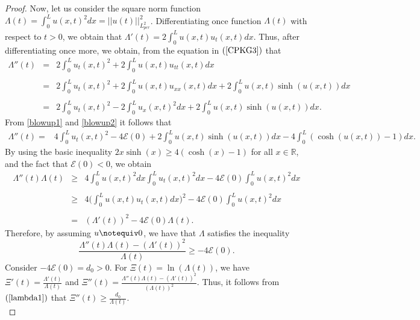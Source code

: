\documentclass[12pt,reqno,a4paper]{amsart} %
\numberwithin{equation}{section}
\numberwithin{figure}{section}
\begin{document}
\begin{proof}
	Now, let us consider the square norm function
	$\displaystyle \Lambda(t)=\int_0^Lu(x,t)^2dx=||u(t)||_{L_{per}^2}^2$. Differentiating  once function $\Lambda(t)$ with respect to $t>0$, we obtain that $\displaystyle \Lambda'(t)=2\int_0^Lu(x,t)u_t(x,t)dx$. Thus, after differentiating once more, we obtain, from the equation in $(\ref{CPKG3})$ that
	\begin{equation}\label{blowup2}\begin{array}{llllll}
		\Lambda''(t)&=&\displaystyle 2\int_0^L u_t(x,t)^2+2\int_0^Lu(x,t)u_{tt}(x,t)dx\\\\
		&=&\displaystyle  2\int_0^L u_t(x,t)^2+2\int_0^Lu(x,t)u_{xx}(x,t)dx+2\int_0^Lu(x,t)\sinh (u(x,t))dx\\\\
		&=&\displaystyle  2\int_0^L u_t(x,t)^2-2\int_0^Lu_{x}(x,t)^2dx+2\int_0^Lu(x,t)\sinh (u(x,t))dx. 
	\end{array}\end{equation}
	From \eqref{blowup1} and  \eqref{blowup2} it follows that 	 	
	\begin{align*} 
		\Lambda''(t)=&4\int_0^L u_t(x,t)^2-4\mathcal{E}(0)+2\int_0^Lu(x,t)\sinh (u(x,t))dx-4\int_0^L(\cosh(u(x,t))-1)dx.
	\end{align*}
	By using the basic inequality $2x\sinh(x)\ge 4(\cosh(x)-1)$ for all $x\in \mathbb{R}$, and the fact that $\mathcal{E}(0)<0$, we obtain 
	\begin{equation}\label{blowup3}\begin{array}{lllll}
		\Lambda''(t)\Lambda(t)&\ge& \displaystyle 4\int_0^Lu(x,t)^2dx\int_0^L u_t(x,t)^2dx -4\mathcal{E}(0) \int_0^Lu(x,t)^2dx \\\\
		 &\ge &\displaystyle  4 \biggl (\int_0^Lu(x,t)u_t(x,t)dx\biggl)^2 -4\mathcal{E}(0) \int_0^Lu(x,t)^2dx\\\\ 
		 &= & \displaystyle (	\Lambda'(t))^2-4\mathcal{E}(0) \Lambda(t).
		 \end{array}
	 \end{equation}
		Therefore, by assuming $u\notequiv 0$, we have that $\Lambda$ satisfies the inequality
		\begin{equation}\label{lambda1}
			\frac{\Lambda''(t)\Lambda(t)-(\Lambda'(t))^2}{\Lambda(t)}\ge -4\mathcal{E}(0). 
		\end{equation}
		Consider $-4\mathcal{E}(0)=d_0>0$. For $\displaystyle \Xi(t)=\ln(\Lambda(t))$, we have $\Xi'(t)= \frac{\Lambda'(t) }{\Lambda(t)}$ and $\Xi''(t)=	 \frac{	\Lambda''(t)\Lambda(t)-(	\Lambda'(t))^2}{(\Lambda(t))^2}$. Thus, it follows from $(\ref{lambda1})$ that $\Xi''(t)\ge \frac{ d_0}{\Lambda(t)}$.\\

\end{proof}
\end{document}

